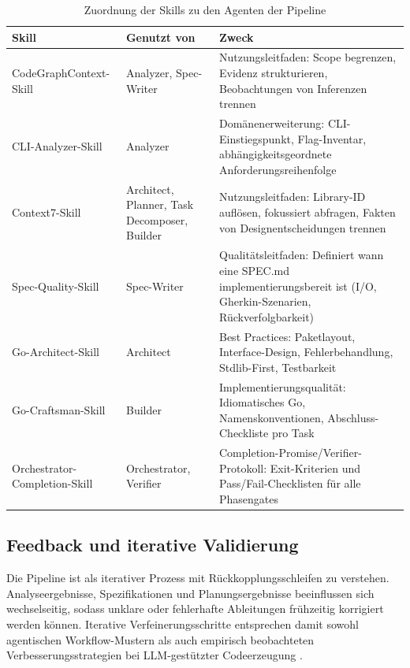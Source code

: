 \begin{table}[H]
\centering
\begin{tabular}{|p{4.2cm}|p{3.0cm}|p{5.3cm}|}
\hline
\textbf{Skill} & \textbf{Genutzt von} & \textbf{Zweck} \\
\hline
CodeGraphContext-Skill & Analyzer, Spec-Writer & Nutzungsleitfaden: Scope begrenzen, Evidenz strukturieren, Beobachtungen von Inferenzen trennen \\
\hline
CLI-Analyzer-Skill & Analyzer & Domänenerweiterung: CLI-Einstiegspunkt, Flag-Inventar, abhängigkeitsgeordnete Anforderungsreihenfolge \\
\hline
Context7-Skill & Architect, Planner, Task Decomposer, Builder & Nutzungsleitfaden: Library-ID auflösen, fokussiert abfragen, Fakten von Designentscheidungen trennen \\
\hline
Spec-Quality-Skill & Spec-Writer & Qualitätsleitfaden: Definiert wann eine SPEC.md implementierungsbereit ist (I/O, Gherkin-Szenarien, Rückverfolgbarkeit) \\
\hline
Go-Architect-Skill & Architect & Best Practices: Paketlayout, Interface-Design, Fehlerbehandlung, Stdlib-First, Testbarkeit \\
\hline
Go-Craftsman-Skill & Builder & Implementierungsqualität: Idiomatisches Go, Namenskonventionen, Abschluss-Checkliste pro Task \\
\hline
Orchestrator-Completion-Skill & Orchestrator, Verifier & Completion-Promise/Verifier-Protokoll: Exit-Kriterien und Pass/Fail-Checklisten für alle Phasengates \\
\hline
\end{tabular}
\caption{Zuordnung der Skills zu den Agenten der Pipeline}
\label{tab:skills}
\end{table}

\subsection{Feedback und iterative Validierung}

Die Pipeline ist als iterativer Prozess mit Rückkopplungsschleifen zu verstehen. Analyseergebnisse, Spezifikationen und Planungsergebnisse beeinflussen sich wechselseitig, sodass unklare oder fehlerhafte Ableitungen frühzeitig korrigiert werden können. Iterative Verfeinerungsschritte entsprechen damit sowohl agentischen Workflow-Mustern als auch empirisch beobachteten Verbesserungsstrategien bei LLM-gestützter Codeerzeugung \parencite{yang2024sweagent,midolo2026promptguidelines}.

